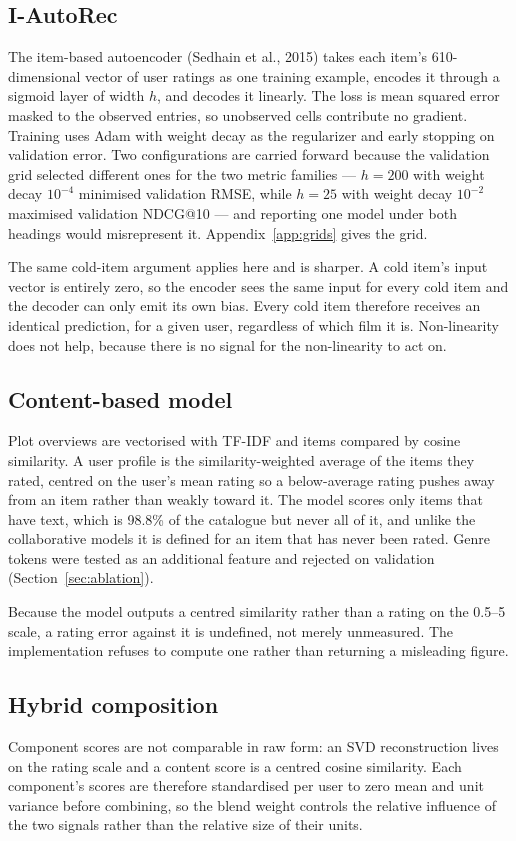 \documentclass[10pt,twocolumn,letterpaper]{article}
\begin{document}
\subsection{I-AutoRec}
The item-based autoencoder (Sedhain et al., 2015) takes each item's
610-dimensional vector of user ratings as one training example, encodes it
through a sigmoid layer of width $h$, and decodes it linearly. The loss is
mean squared error masked to the observed entries, so unobserved cells
contribute no gradient. Training uses Adam with weight decay as the
regularizer and early stopping on validation error. Two configurations are
carried forward because the validation grid selected different ones for the
two metric families --- $h=200$ with weight decay $10^{-4}$ minimised
validation RMSE, while $h=25$ with weight decay $10^{-2}$ maximised validation
NDCG@10 --- and reporting one model under both headings would misrepresent it.
Appendix~\ref{app:grids} gives the grid.

The same cold-item argument applies here and is sharper. A cold item's input
vector is entirely zero, so the encoder sees the same input for every cold
item and the decoder can only emit its own bias. Every cold item therefore
receives an identical prediction, for a given user, regardless of which film
it is. Non-linearity does not help, because there is no signal for the
non-linearity to act on.

\subsection{Content-based model}
Plot overviews are vectorised with TF-IDF and items compared by cosine
similarity. A user profile is the similarity-weighted average of the items
they rated, centred on the user's mean rating so a below-average rating pushes
away from an item rather than weakly toward it. The model scores only items
that have text, which is 98.8\% of the catalogue but never all of it, and
unlike the collaborative models it is defined for an item that has never been
rated. Genre tokens were tested as an additional feature and rejected on
validation (Section~\ref{sec:ablation}).

Because the model outputs a centred similarity rather than a rating on the
0.5--5 scale, a rating error against it is undefined, not merely unmeasured.
The implementation refuses to compute one rather than returning a misleading
figure.

\subsection{Hybrid composition}\label{sec:hybrid}
Component scores are not comparable in raw form: an SVD reconstruction lives
on the rating scale and a content score is a centred cosine similarity. Each
component's scores are therefore standardised per user to zero mean and unit
variance before combining, so the blend weight controls the relative influence
of the two signals rather than the relative size of their units.
\end{document}
